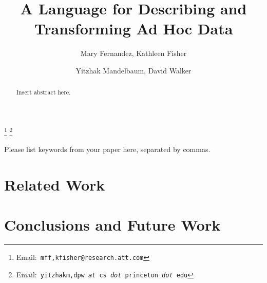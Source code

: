\documentclass{entcs}
\begin{document}
\begin{frontmatter}
  \title{A Language for Describing and Transforming Ad Hoc Data} 
  \author{Mary Fernandez,
    Kathleen Fisher}
  \address{AT\&T\\ 
    Florham Park,NJ USA} 
  \author{Yitzhak Mandelbaum,
    David Walker}
  \address{Department of Computer Science\\ 
    Princeton University\\
    Princeton,NJ USA} 
  \thanks[attemail]{Email:\texttt{\normalshape
        mff,kfisher@research.att.com}}
  \thanks[premail]{Email:\texttt{\normalshape
        yitzhakm,dpw {\it at} cs {\it dot} princeton {\it dot} edu}}
\begin{abstract} 
  Insert abstract here.
\end{abstract}
\begin{keyword}
  Please list keywords from your paper here, separated by commas.
\end{keyword}
\end{frontmatter}









\section{Related Work}
\label{sec:related-work}

\section{Conclusions and Future Work}
\label{sec:conclusion}
\end{document}
